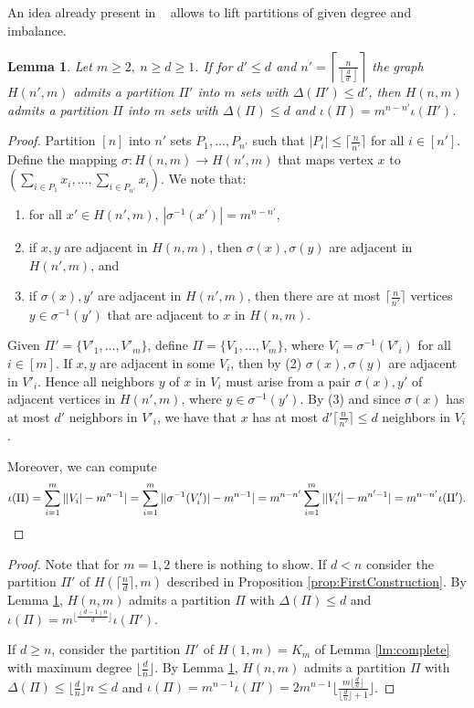 \documentclass[a4paper,10pt]{amsart}
\newtheorem{lem}[thm]{Lemma}
\begin{document}
An idea already present in ~\cite{PT24} allows to lift partitions of given degree and imbalance. 

\begin{lem}\label{lm:lifting}
Let $m\geq 2,\ n\geq d\geq  1$. If for $d'\leq d$ and $n'=\left\lceil\frac{n}{\left\lfloor\frac{d}{d'}\right\rfloor}\right\rceil$ the graph  $H(n',m)$ admits a partition $\Pi'$ into $m$ sets with $\Delta(\Pi')\leq d'$, %
then $H(n,m)$ admits a partition $\Pi$ into $m$ sets with $\Delta(\Pi)\leq d$ and $\iota(\Pi) =  m^{n-n'} \iota(\Pi')$.
\end{lem}
\begin{proof}
Partition $[n]$ into $n'$ sets $P_1, \ldots, P_{n'}$ such that $|P_i|\leq \lceil\frac{n}{n'}\rceil$ for all $i\in [n']$. Define the mapping $\sigma\colon H(n,m)\to H(n',m)$ that maps vertex $x$ to $(\sum_{i\in P_1}x_i, \ldots, \sum_{i\in P_{n'}}x_i)$. We note that:\begin{enumerate}
    \item for all $x'\in H(n',m)$, $|\sigma^{-1}(x')|=m^{n-n'}$,
    \item if $x,y$ are adjacent in $H(n,m)$, then $\sigma(x), \sigma(y)$  are adjacent in $H(n',m)$, and
    \item if $\sigma(x),y'$ are adjacent in $H(n',m)$, then there are at most $\lceil\frac{n}{n'}\rceil$ vertices $y\in \sigma^{-1}(y')$ that are adjacent to $x$ in $H(n,m)$.
\end{enumerate}

Given $\Pi'=\{V'_1, \ldots, V'_m\}$, define $\Pi=\{V_1, \ldots, V_m\}$, where $V_i=\sigma^{-1}(V'_i)$ for all $i\in[m]$. If $x,y$ are adjacent in some $V_i$, then by (2) $\sigma(x), \sigma(y)$  are adjacent in $V'_i$. Hence all neighbors $y$ of $x$ in $V_i$ must arise from a pair $\sigma(x),y'$ of adjacent vertices in $H(n',m)$, where $y\in \sigma^{-1}(y')$. By (3) and since $\sigma(x)$ has at most $d'$ neighbors in $V'_i$, we have that $x$ has at most $d'\lceil\frac{n}{n'}\rceil\leq d$ neighbors in $V_i$. 

Moreover, we can compute \[ \iota(\Pi)=\sum_{i=1}^m||V_i|-m^{n-1}|=\sum_{i=1}^m||\sigma^{-1}(V_i')|-m^{n-1}|=m^{n-n'}\sum_{i=1}^m||V'_i|-m^{n'-1}|=m^{n-n'}\iota(\Pi'). \qedhere \]
\end{proof}


\imbalancedpartitions*
\begin{proof}
Note that for $m=1,2$ there is nothing to show.
If $d<n$ consider the partition $\Pi'$ of $H(\lceil \frac{n}{d}  \rceil,m)$ described in Proposition \ref{prop:FirstConstruction}. By Lemma \ref{lm:lifting}, $H(n,m)$ admits a partition $\Pi$ with $\Delta(\Pi) \leq d$ and $\iota(\Pi) = m^{\lfloor \frac{(d-1) n}{d} \rfloor } \iota (\Pi')$.

If $d  \geq n$, consider the partition $\Pi'$ of $H(1,m) = K_m$ of Lemma \ref{lm:complete} with maximum degree $\lfloor \frac{d}{n} \rfloor$. By Lemma \ref{lm:lifting}, $H(n,m)$ admits a partition $\Pi$ with $\Delta(\Pi) \leq \lfloor \frac{d}{n} \rfloor n \leq d$ and $\iota(\Pi) = m^{n-1} \iota (\Pi') = 2 m^{n-1} \bigg\lfloor \frac{m \lfloor \frac{d}{n} \rfloor }{\lfloor \frac{d}{n} \rfloor + 1 } \bigg\rfloor$.
\end{proof}
\end{document}
